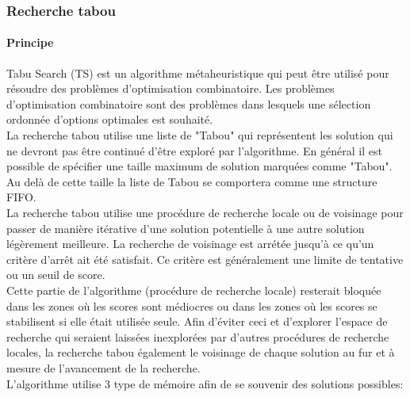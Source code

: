 \subsubsection{Recherche tabou}
\paragraph{Principe}

Tabu Search (TS) est un algorithme métaheuristique qui peut être utilisé pour résoudre des problèmes d'optimisation combinatoire. Les problèmes d'optimisation combinatoire sont des problèmes dans lesquels une sélection ordonnée d'options optimales est souhaité. \\

La recherche tabou utilise une liste de "Tabou" qui représentent les solution qui ne devront pas être continué d'être exploré par l'algorithme. En général il est possible de spécifier une taille maximum de solution marquées comme "Tabou". Au delà de cette taille la liste de Tabou se comportera comme une structure FIFO. \\

La recherche tabou utilise une procédure de recherche locale ou de voisinage pour passer de manière itérative d'une solution potentielle à une autre solution légèrement meilleure. La recherche de voisinage est arrétée jusqu'à ce qu'un critère d'arrêt ait été satisfait. Ce critère est généralement une limite de tentative ou un seuil de score. \\

Cette partie de l'algorithme (procédure de recherche locale) resterait bloquée dans les zones où les scores sont médiocres ou dans les zones où les scores se stabilisent si elle était utilisée seule. Afin d'éviter ceci et d'explorer l'espace de recherche qui seraient laissées inexplorées par d'autres procédures de recherche locales, la recherche tabou également le voisinage de chaque solution au fur et à mesure de l'avancement de la recherche. \\

\newpage
\noindent
L'algorithme utilise 3 type de mémoire afin de se souvenir des solutions possibles:

